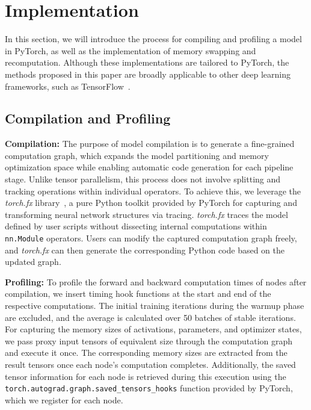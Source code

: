 \section{Implementation}
\label{sec:imp}
In this section, we will introduce the process for compiling and profiling a model in PyTorch,
as well as the implementation of memory swapping and recomputation.
Although these implementations are tailored to PyTorch,
the methods proposed in this paper are broadly applicable to other deep learning frameworks,
such as TensorFlow~\cite{abadiTensorFlowSystemLargeScale2016}.

\subsection{Compilation and Profiling}
\textbf{Compilation:} The purpose of model compilation
is to generate a fine-grained computation graph,
which expands the model partitioning and memory optimization space
while enabling automatic code generation for each pipeline stage.
Unlike tensor parallelism, this process does not involve splitting and tracking operations within individual operators.
To achieve this, we leverage the \emph{torch.fx} library~\cite{reedTorchFxPractical2022},
a pure Python toolkit provided by PyTorch for capturing and transforming neural network structures via tracing.
\emph{torch.fx} traces the model defined by user scripts without
dissecting internal computations within \texttt{nn.Module} operators.
Users can modify the captured computation graph freely,
and \emph{torch.fx} can then generate the corresponding Python code based on the updated graph.

\textbf{Profiling:} To profile the forward and backward computation times of nodes after compilation,
we insert timing hook functions at the start and end of the respective computations.
The initial training iterations during the warmup phase are excluded,
and the average is calculated over 50 batches of stable iterations.
For capturing the memory sizes of activations, parameters, and optimizer states,
we pass proxy input tensors of equivalent size through the computation graph and execute it once.
The corresponding memory sizes are extracted from the result tensors once each node’s computation completes.
Additionally, the saved tensor information for each node is retrieved during this execution
using the \texttt{torch.autograd.graph.saved\_tensors\_hooks} function provided by PyTorch, which we register for each node.


